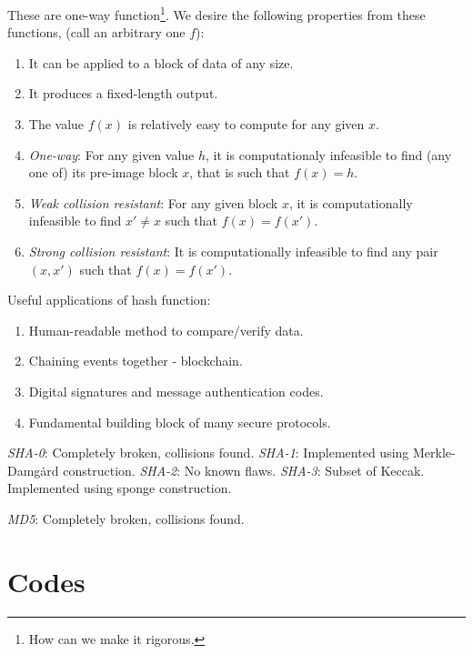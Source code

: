 \documentclass[a4paper, 12pt]{book} %
\begin{document}
These are one-way function\footnote{How can we make it rigorous.}. We desire the following properties from these functions, (call an arbitrary one $f$):
\begin{enumerate}
    \item It can be applied to a block of data of any size.
    \item It produces a fixed-length output.
    \item The value $f(x)$ is relatively easy to compute for any given $x$.
    \item \emph{One-way}: For any given value $h$, it is computationaly infeasible to find (any one of) its pre-image block $x$, that is such that $f(x) = h$.
    \item \emph{Weak collision resistant}: For any given block $x$, it is computationally infeasible to find $x' \neq x$ such that $f(x) = f(x')$.
    \item \emph{Strong collision resistant}: It is computationally infeasible to find any pair $(x, x')$ such that $f(x) = f(x')$.
\end{enumerate} 


Useful applications of hash function:
\begin{enumerate}
    \item Human-readable method to compare/verify data.
    \item Chaining events together - blockchain.
    \item Digital signatures and message authentication codes.
    \item Fundamental building block of many secure protocols.
\end{enumerate}

\begin{example}
    \emph{SHA-0}: Completely broken, collisions found.
    \emph{SHA-1}: Implemented using Merkle-Damg\.ard construction. 
    \emph{SHA-2}: No known flaws.
    \emph{SHA-3}: Subset of Keccak. Implemented using sponge construction.
\end{example}



\begin{example}
    \emph{MD5}: Completely broken, collisions found.
\end{example}

\chapter{Codes}
\end{document}
